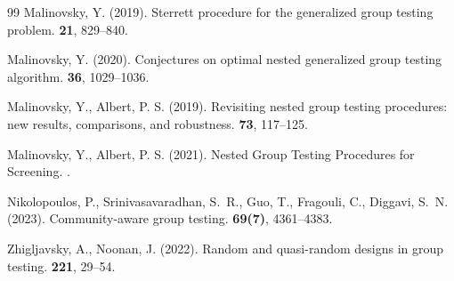 \documentclass[12pt]{article}
\begin{document}
\begin{thebibliography}{99}
Malinovsky, Y. (2019).
\newblock Sterrett procedure for the generalized group testing problem.
 {\textbf{21},}  829--840.

Malinovsky, Y. (2020).
\newblock Conjectures on optimal nested generalized group testing algorithm.
 {\textbf{36},}  1029--1036.


 Malinovsky, Y., Albert, P. S. (2019).
\newblock Revisiting nested group testing procedures: new results, comparisons, and robustness.
 {\textbf{73},} 117--125.

 Malinovsky, Y., Albert, P. S. (2021).
\newblock Nested Group Testing Procedures for Screening.
.










Nikolopoulos, P.,  Srinivasavaradhan, S.~R., Guo, T., Fragouli, C., Diggavi, S.~N. (2023).
\newblock Community-aware group testing.
 {\textbf{69(7)},} 4361--4383.




Zhigljavsky, A., Noonan, J. (2022).
\newblock Random and quasi-random designs in group testing.
 {\textbf{ 221},} 29--54.




\end{thebibliography}
\end{document}
